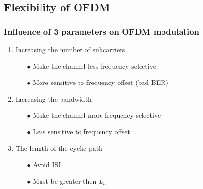 \documentclass[11pt]{beamer}
\begin{document}
\subsection{Flexibility of OFDM}

\begin{frame}
\frametitle{Influence of 3 parameters on OFDM modulation}

\begin{enumerate}
\item Increasing the number of subcarriers

	\begin{itemize}
		\item[$\bullet$] Make the channel less frequency-selective
		\item[$\bullet$] More sensitive to frequency offset (bad BER)	
	\end{itemize}
	
\item Increasing the bandwidth
	\begin{itemize}
		\item[$\bullet$] Make the channel more frequency-selective
		\item[$\bullet$] Less sensitive to frequency offset
	\end{itemize}

\item The length of the cyclic path	
	\begin{itemize}
		\item[$\bullet$] Avoid ISI
		\item[$\bullet$] Must be greater then $L_h$
	\end{itemize}	

\end{enumerate}

\end{frame}
\end{document}
